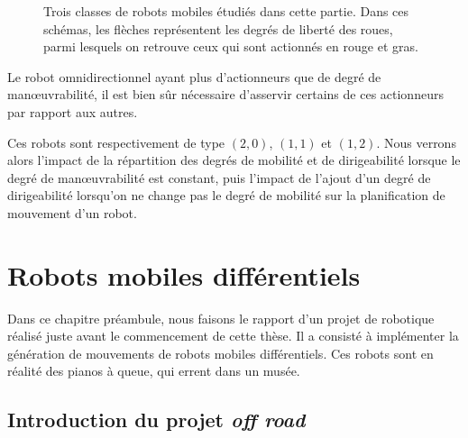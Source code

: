 \documentclass[french,A4paper,]{book}
\begin{document}
\begin{figure}
\centering

\hspace*{\fill}
\hfill%
\hfill%
\hspace*{\fill}

\caption{Trois classes de robots mobiles étudiés dans cette partie. Dans
ces schémas, les flèches représentent les degrés de liberté des roues,
parmi lesquels on retrouve ceux qui sont actionnés en rouge et gras.}

\label{fig:mobiles}

\end{figure}

Le robot omnidirectionnel ayant plus d'actionneurs que de degré de
manœuvrabilité, il est bien sûr nécessaire d'asservir certains de ces
actionneurs par rapport aux autres.

Ces robots sont respectivement de type \((2, 0)\), \((1, 1)\) et
\((1, 2)\). Nous verrons alors l'impact de la répartition des degrés de
mobilité et de dirigeabilité lorsque le degré de manœuvrabilité est
constant, puis l'impact de l'ajout d'un degré de dirigeabilité lorsqu'on
ne change pas le degré de mobilité sur la planification de mouvement
d'un robot.

\renewcommand{\thefigure}{\Alph{chapter}-\arabic{figure}}
\renewcommand{\thetable}{\Alph{chapter}-\arabic{table}}
\renewcommand{\thealgorithm}{\Alph{chapter}-\arabic{algorithm}}

\chapter{Robots mobiles différentiels}\label{sec:offroad}

Dans ce chapitre préambule, nous faisons le rapport d'un projet de
robotique réalisé juste avant le commencement de cette thèse. Il a
consisté à implémenter la génération de mouvements de robots mobiles
différentiels. Ces robots sont en réalité des pianos à queue, qui errent
dans un musée.

\section{\texorpdfstring{Introduction du projet \emph{off
road}}{Introduction du projet off road}}\label{introduction-du-projet-off-road}
\end{document}
